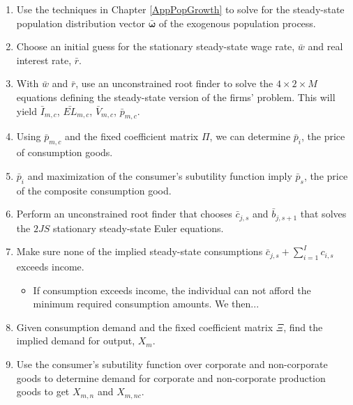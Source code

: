  
   \begin{enumerate}
    \item Use the techniques in Chapter \ref{AppPopGrowth} to solve for the steady-state population distribution vector $\bm{\bar{\omega}}$ of the exogenous population process.
    \item Choose an initial guess for the stationary steady-state wage rate, $\bar{w}$ and real interest rate, $\bar{r}$.
   \item With $\bar{w}$ and $\bar{r}$, use an unconstrained root finder to solve the $4\times 2 \times M$ equations defining the steady-state version of the firms' problem.  This will yield $\bar{I}_{m,c}$, $\bar{EL}_{m,c}$, $\bar{V}_{m,c}$, $\bar{p}_{m,c}$.
   \item Using $\bar{p}_{m,c}$ and the fixed coefficient matrix $\Pi$, we can determine $\bar{p}_{i}$, the price of consumption goods.
   \item $\bar{p}_{i}$ and maximization of the consumer's subutility function imply $\bar{p}_{s}$, the price of the composite consumption good.
    \item Perform an unconstrained root finder that chooses $\bar{c}_{j,s}$ and $\bar{b}_{j,s+1}$ that solves the $2JS$ stationary steady-state Euler equations.
    \item Make sure none of the implied steady-state consumptions $\bar{c}_{j,s}+\sum_{i=1}^{I}c_{i,s}$ exceeds income.
      \begin{itemize}
        \item If consumption exceeds income, the individual can not afford the minimum required consumption amounts.  We then...
      \end{itemize}
    \item Given consumption demand and the fixed coefficient matrix $\Xi$, find the implied demand for output, $X_{m}$.
    \item Use the consumer's subutility function over corporate and non-corporate goods to determine demand for corporate and non-corporate production goods to get $X_{m,n}$ and $X_{m,nc}$.

\end{enumerate}
